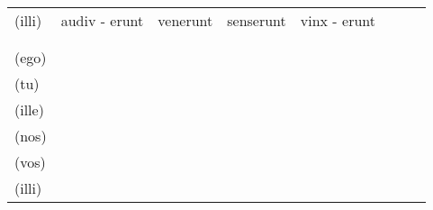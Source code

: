 \documentclass[a4paper, landscape]{article}
\begin{document}
\begin{landscape}
\begin{table}[]
\begin{tabular}{llllllll}
	(illi)	& audiv - erunt	& venerunt	& senserunt	& vinx - erunt	&  &  & \\
	& & & & &  &  & \\
	& & & & &  &  & \\
	(ego)	& & & & &  &  & \\
	(tu)	& & & & &  &  & \\
	(ille)	& & & & &  &  & \\
	(nos)	& & & & &  &  & \\
	(vos)	& & & & &  &  & \\
	(illi)	& & & & &  &  & \\

\end{tabular}
\end{table}
\end{landscape}
\end{document}
